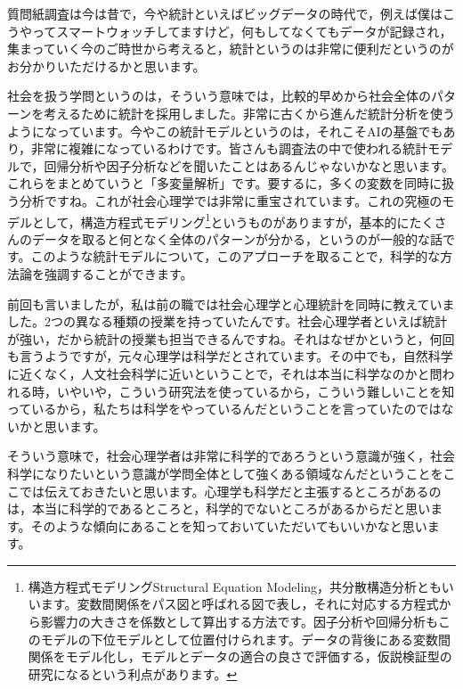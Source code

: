 \documentclass{ltjsbook}
\begin{document}
質問紙調査は今は昔で，今や統計といえばビッグデータの時代で，例えば僕はこうやってスマートウォッチしてますけど，何もしてなくてもデータが記録され，集まっていく今のご時世から考えると，統計というのは非常に便利だというのがお分かりいただけるかと思います。

社会を扱う学問というのは，そういう意味では，比較的早めから社会全体のパターンを考えるために統計を採用しました。非常に古くから進んだ統計分析を使うようになっています。今やこの統計モデルというのは，それこそAIの基盤でもあり，非常に複雑になっているわけです。皆さんも調査法の中で使われる統計モデルで，回帰分析や因子分析などを聞いたことはあるんじゃないかなと思います。これらをまとめていうと「多変量解析」です。要するに，多くの変数を同時に扱う分析ですね。これが社会心理学では非常に重宝されています。これの究極のモデルとして，構造方程式モデリング\footnote{構造方程式モデリングStructural Equation Modeling，共分散構造分析ともいいます。変数間関係をパス図と呼ばれる図で表し，それに対応する方程式から影響力の大きさを係数として算出する方法です。因子分析や回帰分析もこのモデルの下位モデルとして位置付けられます。データの背後にある変数間関係をモデル化し，モデルとデータの適合の良さで評価する，仮説検証型の研究になるという利点があります。}というものがありますが，基本的にたくさんのデータを取ると何となく全体のパターンが分かる，というのが一般的な話です。このような統計モデルについて，このアプローチを取ることで，科学的な方法論を強調することができます。

前回も言いましたが，私は前の職では社会心理学と心理統計を同時に教えていました。2つの異なる種類の授業を持っていたんです。社会心理学者といえば統計が強い，だから統計の授業も担当できるんですね。それはなぜかというと，何回も言うようですが，元々心理学は科学だとされています。その中でも，自然科学に近くなく，人文社会科学に近いということで，それは本当に科学なのかと問われる時，いやいや，こういう研究法を使っているから，こういう難しいことを知っているから，私たちは科学をやっているんだということを言っていたのではないかと思います。

そういう意味で，社会心理学者は非常に科学的であろうという意識が強く，社会科学になりたいという意識が学問全体として強くある領域なんだということをここでは伝えておきたいと思います。心理学も科学だと主張するところがあるのは，本当に科学的であるところと，科学的でないところがあるからだと思います。そのような傾向にあることを知っておいていただいてもいいかなと思います。
\end{document}
